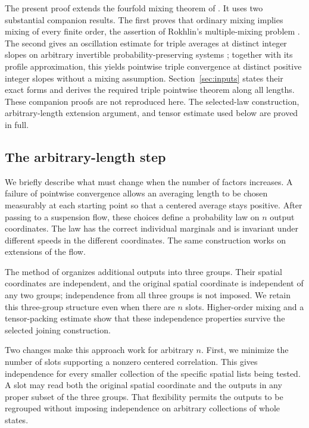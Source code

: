 The present proof extends the fourfold mixing theorem of
\cite[Theorem~1.1]{FourfoldCompanion}. It uses two substantial
companion results. The first proves that ordinary mixing implies
mixing of every finite order, the assertion of Rokhlin's
multiple-mixing problem \cite[Theorem~1.1]{MixingCompanion}.
The second gives an oscillation estimate for triple averages at
distinct integer slopes on arbitrary invertible probability-preserving
systems \cite[Proposition~3.5]{SlopesCompanion}; together with its
profile approximation, this yields pointwise triple convergence
at distinct positive integer slopes without a mixing assumption.
Section~\ref{sec:inputs} states their exact forms and derives the
required triple pointwise theorem along all lengths. These companion
proofs are not reproduced here. The selected-law construction,
arbitrary-length extension argument, and tensor estimate used below
are proved in full.

\subsection{The arbitrary-length step}

We briefly describe what must change when the number of factors
increases. A failure of pointwise convergence allows an averaging
length to be chosen measurably at each starting point so that a
centered average stays positive. After passing to a suspension flow,
these choices define a probability law on $n$ output coordinates.
The law has the correct individual marginals and is invariant under
different speeds in the different coordinates. The same construction
works on extensions of the flow.

The method of \cite[Sections~3--6]{FourfoldCompanion} organizes
additional outputs into three groups. Their spatial coordinates are
independent, and the original spatial coordinate is independent of
any two groups; independence from all three groups is not imposed.
We retain this three-group structure even when there are $n$ slots.
Higher-order mixing and a tensor-packing estimate show that these
independence properties survive the selected joining construction.

Two changes make this approach work for arbitrary $n$. First, we
minimize the number of slots supporting a nonzero centered correlation.
This gives independence for every smaller collection of the specific
spatial lists being tested. A slot may read both the original spatial
coordinate and the outputs in any proper subset of the three groups.
That flexibility permits the outputs to be regrouped without imposing
independence on arbitrary collections of whole states.

